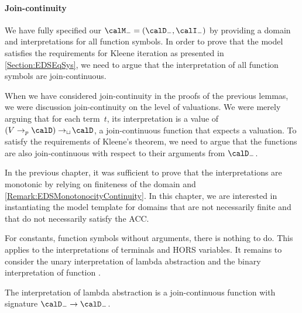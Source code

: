 \documentclass[../../diss.tex]{subfiles}
\begin{document}
\paragraph{Join-continuity}

We have fully specified our $\modelt = (\domaint,\interpretationt)$ by providing a domain and interpretations for all function symbols.
In order to prove that the model satisfies the requirements for Kleene iteration as presented in \cref{Section:EDSEqSys}, we need to argue that the interpretation of all function symbols are join-continuous.

When we have considered join-continuity in the proofs of the previous lemmas, we were discussion join-continuity on the level of valuations.
We were merely arguing that for each term~$t$, its interpretation is a value of $(V \pto \domain) \cto \domain$, \ie a join-continuous function that expects a valuation.
To satisfy the requirements of Kleene's theorem, we need to argue that the functions are also join-continuous with respect to their arguments from $\domaint$.

\begin{remark*}
In the previous chapter, it was sufficient to prove that the interpretations are monotonic by relying on finiteness of the domain and \cref{Remark:EDSMonotonocityContinuity}.
In this chapter, we are interested in instantiating the model template for domains that are not necessarily finite and that do not necessarily satisfy the ACC.\@
\end{remark*}

For constants, function symbols without arguments, there is nothing to do.
This applies to the interpretations of terminals and HORS variables.
It remains to consider the unary interpretation of lambda abstraction and the binary interpretation of function .

\begin{lemma}%
\label{Lemma:HORSTemplateLambdaJoinCont}%
    The interpretation of lambda abstraction is a join-continuous function with signature $\domaint \to \domaint$.
\end{lemma}
\end{document}
